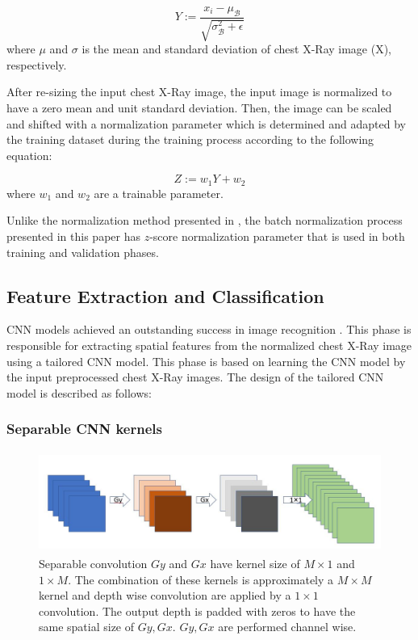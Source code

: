 \begin{equation}
Y := \frac{x_i - \mu_{\mathcal B}}{\sqrt{\sigma_{\mathcal B}^2 + \epsilon}}
\label{eq1}
\end{equation}
where $\mu$ and $\sigma$ is the mean  and standard deviation of chest X-Ray image (X), respectively.

After re-sizing the input chest X-Ray image, the input image is normalized to have a zero mean and unit standard deviation. Then,  the image can be scaled and shifted with a normalization parameter which is determined and adapted by the training dataset during the training process according to the following equation: 

\begin{equation}
Z := w_1 Y + w_2
\label{eq2}
\end{equation}
where $w_1$ and $w_2$ are a trainable parameter.

Unlike the  normalization method presented in \cite{ioffe2015batch}, the batch normalization process presented in this paper has $z$-score normalization parameter that is used in both training and validation phases.


\subsection{Feature Extraction and Classification}

CNN models achieved an outstanding success in image recognition \cite{lecun2015deep}. This phase  is responsible for extracting spatial features from the normalized chest X-Ray image using a tailored CNN model.  This phase is based on learning the CNN model by the input preprocessed chest X-Ray images. The design of the tailored CNN model is described as follows: 

\subsubsection{Separable CNN kernels}
\begin{figure}
\begin{center}
\includegraphics[height=33mm,width=14.0cm]{Figures/fig2.jpg}
\caption{Separable convolution  $Gy$ and $Gx$ have kernel size of $M\times1$ and $1 \times M$. The combination of these kernels is approximately a $M\times M$ kernel  and depth wise convolution are applied by a $1\times1$ convolution. The output depth  is padded with zeros to have the same spatial size of  $Gy, Gx$. $Gy, Gx$ are performed channel wise. }
\label{fig2}\end{center}\end{figure}


